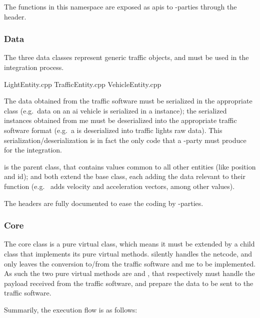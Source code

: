 The functions in this namespace are exposed as \glspl{api} to -parties through the  header.

\subsubsection{Data}

The three data classes represent generic traffic objects, and must be used in the integration process.

\begin{filelist}
	LightEntity.cpp
	TrafficEntity.cpp
	VehicleEntity.cpp
\end{filelist}

The data obtained from the traffic software must be serialized in the appropriate class (e.g.\ data on an \gls{ai} vehicle is serialized in a  instance); the serialized instances obtained from \gls{me} must be deserialized into the appropriate traffic software format (e.g.\ a  is deserialized into traffic lights raw data). This serialization/deserialization is in fact the only code that a -party must produce for the integration.

 is the parent class, that contains values common to all other entities (like position and id);  and  both extend the base class, each adding the data relevant to their function (e.g.\  adds velocity and acceleration vectors, among other values).

The headers are fully documented to ease the coding by -parties.

\subsubsection{Core}

The core class is a pure virtual class, which means it must be extended by a child class that implements its pure virtual methods.  silently handles the netcode, and only leaves the conversion to/from the traffic software and \gls{me} to be implemented. As such the two pure virtual methods are  and , that respectively must handle the payload received from the traffic software, and prepare the data to be sent to the traffic software.

Summarily, the execution flow is as follows:

